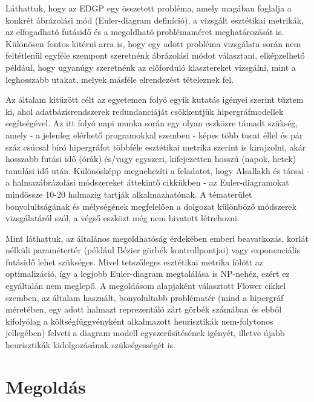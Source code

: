 Láthattuk, hogy az EDGP egy összetett probléma, amely magában foglalja a konkrét ábrázolási mód (Euler-diagram definíció), a vizsgált esztétikai metrikák, az elfogadható futásidő és a megoldható problémaméret meghatározását is. Különösen fontos kitérni arra is, hogy egy adott probléma vizsgálata során nem feltétlenül egyféle szempont szeretnénk ábrázolási módot választani, elképzelhető például, hogy ugyanúgy szeretnénk az előforduló klasztereket vizsgálni, mint a leghosszabb utakat, melyek másféle elrendezést tételeznek fel.


Az általam kitűzött célt az egyetemen folyó egyik kutatás igényei szerint tűztem ki, ahol adatbázisrendszerek redundanciáját csökkentjük hipergráfmodellek segítségével. Az itt folyó napi munka során egy olyan eszközre támadt szükség, amely - a jelenleg elérhető programokkal szemben - képes több tucat éllel és pár száz csúcsal bíró hipergráfot többféle esztétikai metrika szerint is kirajzolni, akár hosszabb futási idő (órák) és/vagy egyszeri, kifejezetten hosszú (napok, hetek) tanulási idő után. Különösképp megnehezíti a feladatot, hogy Alsallakh és társai - a halmazábrázolási módszereket áttekintő cikkükben\cite{alsallakah2016_the_state_of_the_art_set_visualization} - az Euler-diagramokat mindössze 10-20 halmazig tartják alkalmazhatónak. A tématerület bonyolultságának és mélységének megfelelően a dolgozat különböző módszerek vizsgálatáról szól, a végső eszközt még nem hivatott létrehozni.


Mint láthattuk, az általános megoldhatóság érdekében emberi beavatkozás, korlát nélküli paramétertér (például Bézier görbék kontrollpontjai\cite{layout_metrics}) vagy exponenciális futásidő\cite{inductive_euler} lehet szükséges. Mivel tetszőleges esztétikai metrika fölött az optimalizáció, így a legjobb Euler-diagram megtalálása is NP-nehéz, ezért ez egyáltalán nem meglepő. A megoldásom alapjaként választott Flower cikkel\cite{layout_metrics} szemben, az általam használt, bonyolultabb problématér (mind a hipergráf méretében, egy adott halmazt reprezentáló zárt görbék számában és ebből kifolyólag a költségfüggvényként alkalmazott heurisztikák nem-folytonos jellegében) felveti a diagram modell egyszerűsítésének igényét, illetve újabb heurisztikák kidolgozásának szükségességét is.


\section{Megoldás}

